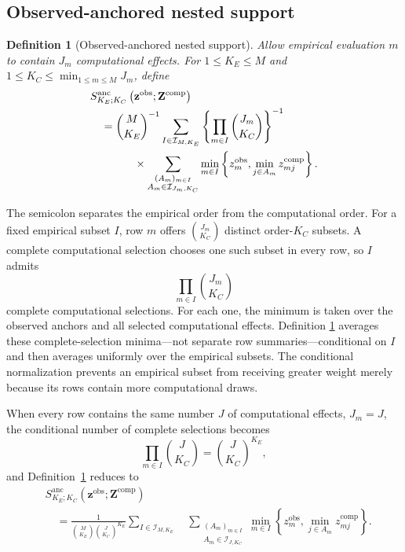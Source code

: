 \documentclass[11pt]{article}
\newcommand{\Sanc}{S^{\mathrm{anc}}}
\newtheorem{definition}{Definition}
\theoremstyle{remark}
\begin{document}
\subsection{Observed-anchored nested support}

\begin{definition}[Observed-anchored nested support]
\label{def:anchored-support}
Allow empirical evaluation $m$ to contain $J_m$ computational effects. For
$1\leq K_E\leq M$ and
$1\leq K_C\leq\min_{1\leq m\leq M}J_m$, define
\begin{align}
&\Sanc_{K_E;K_C}
\left(\mathbf z^{\mathrm{obs}};\mathbf Z^{\mathrm{comp}}\right)
\notag\\
&\quad=
\binom{M}{K_E}^{-1}
\sum_{I\in\mathcal I_{M,K_E}}
\left\{
\prod_{m\in I}\binom{J_m}{K_C}
\right\}^{-1}
\notag\\
&\qquad\qquad\times
\sum_{\substack{
(A_m)_{m\in I}\\
A_m\in\mathcal I_{J_m,K_C}}}
\min_{m\in I}
\left\{
z_m^{\mathrm{obs}},
\min_{j\in A_m}z_{mj}^{\mathrm{comp}}
\right\}.
\label{eq:anchored-support}
\end{align}
\end{definition}

The semicolon separates the empirical order from the computational order. For
a fixed empirical subset $I$, row $m$ offers $\binom{J_m}{K_C}$ distinct
order-$K_C$ subsets. A complete computational selection chooses one such
subset in every row, so $I$ admits
\[
\prod_{m\in I}\binom{J_m}{K_C}
\]
complete computational selections. For each one, the minimum is taken over
the observed anchors and all selected computational effects. Definition
\ref{def:anchored-support} averages these complete-selection minima---not
separate row summaries---conditional on $I$ and then averages uniformly over
the empirical subsets. The conditional normalization prevents an empirical
subset from receiving greater weight merely because its rows contain more
computational draws.

When every row contains the same number $J$ of computational effects,
$J_m=J$, the conditional number of complete selections becomes
\[
\prod_{m\in I}\binom{J}{K_C}
=
\binom{J}{K_C}^{K_E},
\]
and Definition~\ref{def:anchored-support} reduces to
\begin{align*}
&\Sanc_{K_E;K_C}
\left(\mathbf z^{\mathrm{obs}};\mathbf Z^{\mathrm{comp}}\right)\\
&\quad=
\frac{1}{\binom{M}{K_E}\binom{J}{K_C}^{K_E}}
\sum_{I\in\mathcal I_{M,K_E}}
\quad
\sum_{\substack{
(A_m)_{m\in I}\\
A_m\in\mathcal I_{J,K_C}}}
\min_{m\in I}
\left\{
z_m^{\mathrm{obs}},
\min_{j\in A_m}z_{mj}^{\mathrm{comp}}
\right\}.
\end{align*}
\end{document}
